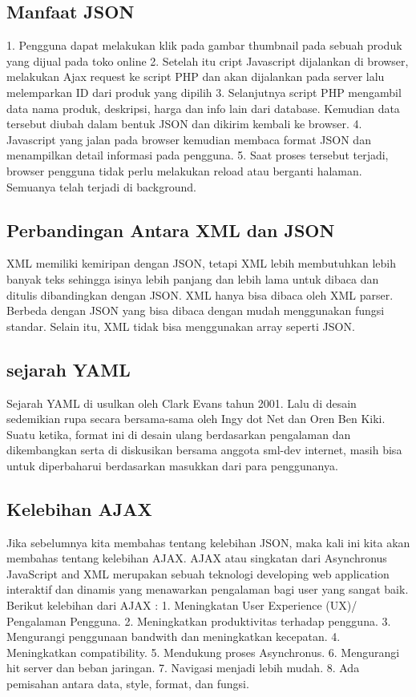 \documentclass[a4paper]{article}
\begin{document}
\subsection{Manfaat JSON}
1.	Pengguna dapat melakukan klik pada gambar thumbnail pada sebuah produk yang dijual pada toko online
2.	Setelah itu cript Javascript dijalankan di browser, melakukan Ajax request ke script PHP dan akan dijalankan pada server lalu melemparkan ID dari produk yang dipilih
3.	Selanjutnya script PHP mengambil data nama produk, deskripsi, harga dan info lain dari database. Kemudian data tersebut diubah dalam bentuk JSON dan dikirim kembali ke browser.
4.	Javascript yang jalan pada browser kemudian membaca format JSON dan menampilkan detail informasi pada pengguna.
5.	Saat proses tersebut terjadi, browser pengguna tidak perlu melakukan reload atau berganti halaman. Semuanya telah terjadi di background.

\subsection{Perbandingan Antara XML dan JSON}
XML memiliki kemiripan dengan JSON, tetapi XML lebih membutuhkan lebih banyak teks sehingga isinya lebih panjang dan lebih lama untuk dibaca dan ditulis dibandingkan dengan JSON. XML hanya bisa dibaca oleh XML parser. Berbeda dengan JSON yang bisa dibaca dengan mudah menggunakan fungsi standar. Selain itu, XML tidak bisa menggunakan array seperti JSON.

\subsection{sejarah YAML}
Sejarah YAML di usulkan oleh Clark Evans tahun 2001. Lalu di desain sedemikian rupa secara bersama-sama oleh Ingy dot Net dan Oren Ben Kiki. Suatu ketika, format ini di desain ulang berdasarkan pengalaman dan dikembangkan serta di diskusikan bersama anggota sml-dev internet, masih bisa untuk diperbaharui berdasarkan masukkan dari para penggunanya.

\subsection{Kelebihan AJAX}
Jika sebelumnya kita membahas tentang kelebihan JSON, maka kali ini kita akan membahas tentang kelebihan AJAX. AJAX atau singkatan dari Asynchronus JavaScript and XML merupakan sebuah teknologi developing web application interaktif dan dinamis yang menawarkan pengalaman bagi user yang sangat baik. Berikut kelebihan dari AJAX :
1.	Meningkatan User Experience (UX)/ Pengalaman Pengguna.
2.	Meningkatkan produktivitas terhadap pengguna.
3.	Mengurangi penggunaan bandwith dan meningkatkan kecepatan.
4.	Meningkatkan compatibility.
5.	Mendukung proses Asynchronus.
6.	Mengurangi hit server dan beban jaringan.
7.	Navigasi menjadi lebih mudah.
8.	Ada pemisahan antara data, style, format, dan fungsi.
\end{document}
